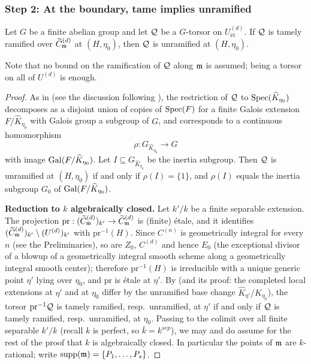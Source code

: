 \subsubsection*{Step 2: At the boundary, tame implies unramified}

\begin{prop}\label{prop:tame_at_boundary_implies_unramified}
    Let $G$ be a finite abelian group and let $\mathcal{Q}$ be a $G$-torsor on $U^{(d)}_{\text{\'et}}$.
    If $\mathcal{Q}$ is tamely ramified over $\widetilde{C}_{\mathfrak{m}}^{(d)}$ at $(H, \eta_0)$, then $\mathcal{Q}$ is unramified at
    $(H, \eta_0)$.
\end{prop}

Note that no bound on the ramification of $\mathcal{Q}$ along $\mathfrak{m}$ is assumed;
being a torsor on all of $U^{(d)}$ is enough.

\begin{proof}
    As in  (see the discussion following
    ), the restriction of $\mathcal{Q}$ to
    $\operatorname{Spec}(\widehat{K}_{\eta_0})$ decomposes as a disjoint union of copies of $\operatorname{Spec}(F)$ for a finite
    Galois extension $F / \widehat{K}_{\eta_0}$ with Galois group a subgroup of $G$, and corresponds to a
    continuous homomorphism
    \[ \rho : G_{\widehat{K}_{\eta_0}} \to G \]
    with image $\operatorname{Gal}(F/\widehat{K}_{\eta_0})$. Let $I \subseteq G_{\widehat{K}_{\eta_0}}$ be the inertia
    subgroup. Then $\mathcal{Q}$ is unramified at $(H,\eta_0)$ if and only if $\rho(I) = \{1\}$, and
    $\rho(I)$ equals the inertia subgroup $G_0$ of $\operatorname{Gal}(F/\widehat{K}_{\eta_0})$.

    \textbf{Reduction to $k$ algebraically closed.}
    Let $k'/k$ be a finite separable extension. The projection
    $\mathrm{pr} : (\widetilde{C}_{\mathfrak{m}}^{(d)})_{k'} \to \widetilde{C}_{\mathfrak{m}}^{(d)}$ is (finite) \'etale, and it identifies
    $(\widetilde{C}_{\mathfrak{m}}^{(d)})_{k'} \setminus (U^{(d)})_{k'}$ with $\mathrm{pr}^{-1}(H)$. Since $C^{(n)}$ is
    geometrically integral for every $n$ (see the Preliminaries), so are $Z_0$, $C^{(d)}$ and hence
    $E_0$ (the exceptional divisor of a blowup of a geometrically integral smooth scheme along a
    geometrically integral smooth center); therefore $\mathrm{pr}^{-1}(H)$ is irreducible with a unique
    generic point $\eta'$ lying over $\eta_0$, and $\mathrm{pr}$ is \'etale at $\eta'$. By
     (and its proof: the completed local extensions at
    $\eta'$ and at $\eta_0$ differ by the unramified base change
    $\widehat{K}_{\eta'} / \widehat{K}_{\eta_0}$), the torsor $\mathrm{pr}^{-1}\mathcal{Q}$ is tamely ramified,
    resp.\ unramified, at $\eta'$ if and only if $\mathcal{Q}$ is tamely ramified, resp.\ unramified, at
    $\eta_0$. Passing to the colimit over all finite separable $k'/k$ (recall $k$ is perfect, so
    $\bar{k} = k^{sep}$), we may and do assume for the rest of the proof that $k$ is algebraically
    closed. In particular the points of $\mathfrak{m}$ are $k$-rational; write
    $\operatorname{supp}(\mathfrak{m}) = \{P_1, \dots, P_s\}$.


\end{proof}

